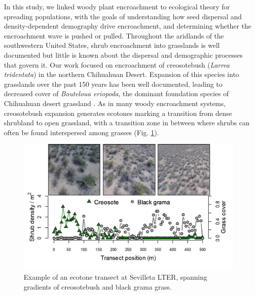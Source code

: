 \documentclass[11pt]{article}\usepackage[]{graphicx}\usepackage[usenames,dvipsnames]{xcolor}
\begin{document}
In this study, we linked woody plant encroachment to ecological theory for spreading populations, with the goals of understanding how seed dispersal and density-dependent demography drive encroachment, and determining whether the encroachment wave is pushed or pulled.
Throughout the aridlands of the southwestern United States, shrub encroachment into grasslands is well documented \citep{d2012synthetic} but little is known about the dispersal and demographic processes that govern it. 
Our work focused on encroachment of creosotebush (\textit{Larrea tridentata}) in the northern Chihuahuan Desert. 
Expansion of this species into grasslands over the past 150 years has been well documented, leading to decreased cover of \textit{Bouteloua eriopoda}, the dominant foundation species of Chihuahuan desert grassland \citep{gardner1951vegetation, buffington1965vegetational, gibbens2005vegetation}.
As in many woody encroachment systems, creosotebush expansion generates ecotones marking a transition from dense shrubland to open grassland, with a transition zone in between where shrubs can often be found interspersed among grasses (Fig. \ref{fig:waves}).

\begin{figure}[H]
  \begin{center}
    \includegraphics[width=\linewidth]{Figures/waves_pics}
  \caption{Example of an ecotone transect at Sevilleta LTER, spanning gradients of creosotebush and black grama grass.}
  \label{fig:waves}
  \end{center}
\end{figure}
\end{document}
